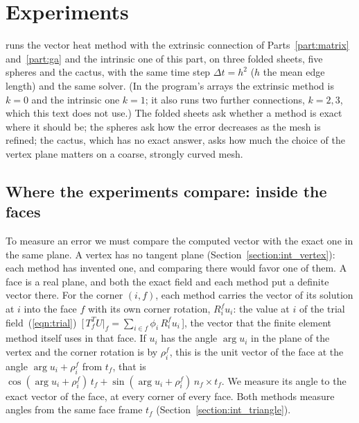 \section{Experiments}
\label{section:int_experiments}

 runs the vector heat method with the extrinsic connection of Parts~\ref{part:matrix} and~\ref{part:ga} and the intrinsic one of this part, on three folded sheets, five spheres and the cactus, with the same time step $\Delta t = h^2$ ($h$ the mean edge length) and the same solver. (In the program's arrays the extrinsic method is $k = 0$ and the intrinsic one $k = 1$; it also runs two further connections, $k = 2, 3$, which this text does not use.) The folded sheets ask whether a method is exact where it should be; the spheres ask how the error decreases as the mesh is refined; the cactus, which has no exact answer, asks how much the choice of the vertex plane matters on a coarse, strongly curved mesh.

\subsection{Where the experiments compare: inside the faces}

To measure an error we must compare the computed vector with the exact one in the same plane. A vertex has no tangent plane (Section~\ref{section:int_vertex}): each method has invented one, and comparing there would favor one of them. A face is a real plane, and both the exact field and each method put a definite vector there. For the corner $(i, f)$, each method carries the vector of its solution at $i$ into the face $f$ with its own corner rotation, $R_i^fu_i$: the value at $i$ of the trial field~(\ref{eqn:trial})~[\,$T_f^TU|_f = \sum_{i\in f}\phi_i\,R_i^fu_i$\,], the vector that the finite element method itself uses in that face. If $u_i$ has the angle $\arg u_i$ in the plane of the vertex and the corner rotation is by $\rho_i^f$, this is the unit vector of the face at the angle $\arg u_i + \rho_i^f$ from $t_f$, that is $\cos(\arg u_i + \rho_i^f)\, t_f + \sin(\arg u_i + \rho_i^f)\, n_f\times t_f$. We measure its angle to the exact vector of the face, at every corner of every face. Both methods measure angles from the same face frame $t_f$ (Section~\ref{section:int_triangle}).

